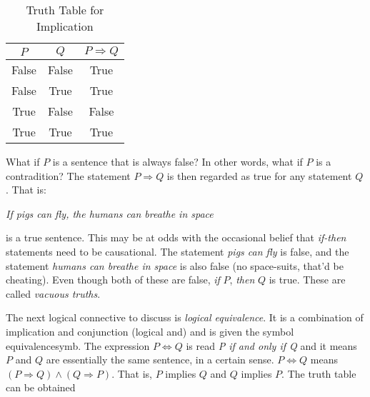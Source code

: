             \begin{table}
                \centering
                \begin{tabular}{c | c | c}
                    $P$&$Q$&$P\Rightarrow{Q}$\\
                    \hline
                    False&False&True\\
                    \hline
                    False&True&True\\
                    \hline
                    True&False&False\\
                    \hline
                    True&True&True
                \end{tabular}
                \caption{Truth Table for Implication}
                \label{tab:truth_table_implication}
            \end{table}
            \par\hfill\par
            What if $P$ is a sentence that is always false? In other words,
            what if $P$ is a contradition? The statement $P\Rightarrow{Q}$
            is then regarded as true for any statement $Q$. That is:
            \begin{center}
                \textit{If pigs can fly, the humans can breathe in space}
            \end{center}
            is a true sentence. This may be at odds with the occasional
            belief that \textit{if-then} statements need to be
            causational. The statement \textit{pigs can fly} is false,
            and the statement \textit{humans can breathe in space} is also
            false (no space-suits, that'd be cheating). Even though both of
            these are false, \textit{if} $P$, \textit{then} $Q$ is true.
            These are called \textit{vacuous truths}.
            \par\hfill\par
            The next logical connective to discuss is
            \textit{logical equivalence}.
            It is a combination of implication
            and conjunction (logical and) and is given the symbol
            \gls{equivalencesymb}. The expression $P\Leftrightarrow{Q}$ is read
            \textit{P if and only if Q} and it means $P$ and $Q$ are essentially
            the same sentence, in a certain sense. $P\Leftrightarrow{Q}$ means
            $(P\Rightarrow{Q})\land(Q\Rightarrow{P})$. That is,
            $P$ implies $Q$ and $Q$ implies $P$. The truth table can be obtained
